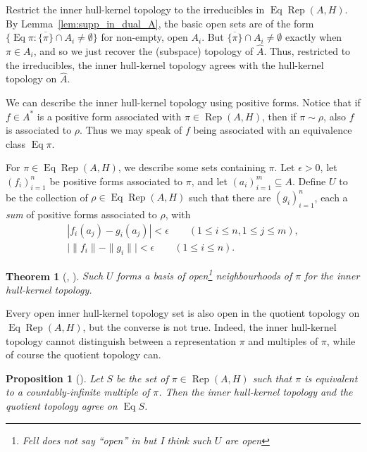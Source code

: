 \documentclass[a4paper,11pt]{article}
\newcommand{\Rep}{\operatorname{Rep}}
\newcommand{\Eq}{\operatorname{Eq}}
\newtheorem{proposition}[lemma]{Proposition}
\newtheorem{theorem}[lemma]{Theorem}
\begin{document}
Restrict the inner hull-kernel topology to the irreducibles in $\Eq\Rep(A,H)$.
By Lemma~\ref{lem:supp_in_dual_A}, the basic open sets are of the form
$\{\Eq\pi : \overline{\{\pi\}} \cap A_i\not=\emptyset \}$ for non-empty, open
$A_i$.  But $\overline{\{\pi\}} \cap A_i\not=\emptyset$ exactly when $\pi\in A_i$,
and so we just recover the (subspace) topology of $\hat A$.  Thus, restricted
to the irreducibles, the inner hull-kernel topology agrees with the hull-kernel
topology on $\hat A$.

We can describe the inner hull-kernel topology using positive forms.
Notice that if $f\in A^*$ is a positive form associated with $\pi\in\Rep(A,H)$,
then if $\pi\sim\rho$, also $f$ is associated to $\rho$.  Thus we may speak of
$f$ being associated with an equivalence class $\Eq\pi$.

For $\pi\in\Eq\Rep(A,H)$, we describe some sets containing $\pi$.  Let $\epsilon>0$,
let $(f_i)_{i=1}^n$ be positive forms associated to $\pi$, and let $(a_i)_{i=1}^m
\subseteq A$.  Define $U$ to be the collection of $\rho\in\Eq\Rep(A,H)$ such that
there are $(g_i)_{i=1}^n$, each a \emph{sum} of positive forms associated to $\rho$,
with
\begin{align*}
    | f_i(a_j) - g_i(a_j) | <\epsilon \qquad (1\leq i\leq n, 1\leq j\leq m), \\
    \big| \|f_i\| - \|g_i\| \big| < \epsilon \qquad (1\leq i\leq n).
\end{align*}

\begin{theorem}[{\cite[Theorem~2.1]{fell2}, \cite[Theorem~5.9]{kan}}]
\label{thm:ihkt_pos_fns}
Such $U$ forms a basis of open\footnote{Fell does not say ``open'' in \cite{fell2}
but I think such $U$ are open} neighbourhoods of $\pi$ for the inner hull-kernel
topology.
\end{theorem}

Every open inner hull-kernel topology set is also open in the quotient topology
on $\Eq\Rep(A,H)$, but the converse is not true.  Indeed, the inner hull-kernel
topology cannot distinguish between a representation $\pi$ and multiples of
$\pi$, while of course the quotient topology can.

\begin{proposition}[{\cite[Lemma~2.4]{fell2}}]
Let $S$ be the set of $\pi\in\Rep(A,H)$ such that $\pi$ is equivalent to a
countably-infinite multiple of $\pi$.  Then the inner hull-kernel topology
and the quotient topology agree on $\Eq S$.
\end{proposition}
\end{document}
